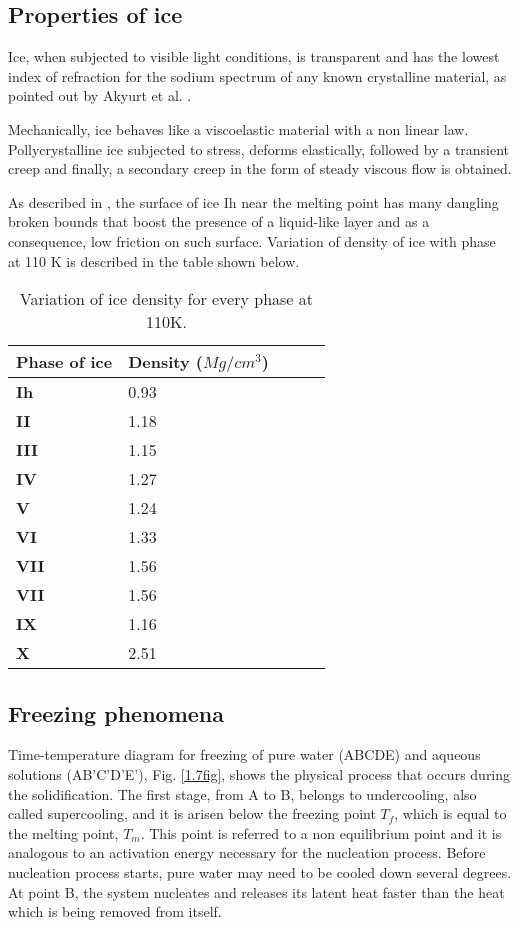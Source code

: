 \subsection{Properties of ice}
\setlength{\parindent}{0.5cm} Ice, when subjected to visible light conditions, is transparent and has the lowest index of refraction for the sodium spectrum of any known crystalline material, as pointed out by Akyurt et al. \cite{akyurt_zaki_habeebullah_2002}.

\noindent Mechanically, ice behaves like a viscoelastic material with a non linear law. Pollycrystalline ice subjected to stress, deforms elastically, followed by a transient creep and finally, a secondary creep in the form of steady viscous flow is obtained.

\noindent As described in \cite{akyurt_zaki_habeebullah_2002}, the surface of ice Ih near the melting point has many dangling broken bounds that boost the presence of a liquid-like layer and as a consequence, low friction on such surface. Variation of density of ice with phase at 110 K is described in the table shown below.

\begin{table}[h!]
	\begin{tabular}{@{}lllll@{}}
		\toprule[1pt]
		\textbf{Phase of ice} & \textbf{Density ($Mg/cm^{3}$)} \\ \midrule[2pt]
		\textbf{Ih} &  0.93 \\
		\textbf{II} &  1.18 \\
		\textbf{III} & 1.15  \\
		\textbf{IV} & 1.27  \\
		\textbf{V} &  1.24 \\
		\textbf{VI} & 1.33  \\
		\textbf{VII} & 1.56	\\
		\textbf{VII} & 1.56	\\
		\textbf{IX} & 1.16  \\
		\textbf{X} &  2.51 \\  \bottomrule[1pt]		
	\end{tabular}
	\centering
	\caption{Variation of ice density for every phase at 110K.}	
	\label{1.1tab}
\end{table}
\subsection{Freezing phenomena}
\setlength{\parindent}{0.5cm} Time-temperature diagram for freezing of pure water (ABCDE) and aqueous solutions (AB'C'D'E'), Fig.  \ref{1.7fig}, shows the physical process that occurs during the solidification. The first stage, from A to B, belongs to undercooling, also called supercooling, and it is arisen below the freezing point $T_f$, which is equal to the melting point, $T_m$. This point is referred to a non equilibrium point and it is analogous to an activation energy necessary for the nucleation process. Before nucleation process starts, pure water may need to be cooled down several degrees. At point B, the system nucleates and releases its latent heat faster than the heat which is being removed from itself.

